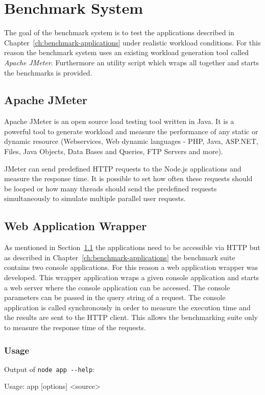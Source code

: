 \chapter{Benchmark System}
The goal of the benchmark system is to test the applications described in Chapter~\ref{ch:benchmark-applications} under realistic workload conditions. For this reason the benchmark system uses an existing workload generation tool called \textit{Apache JMeter}\cite{jmeter}. Furthermore an utility script which wraps all together and starts the benchmarks is provided.
\section{Apache JMeter}
\label{sec:apache-jmeter}
Apache JMeter is an open source load testing tool written in Java. It is a powerful tool to generate workload and measure the performance of any static or dynamic resource (Webservices, Web dynamic languages - PHP, Java, ASP.NET, Files, Java Objects, Data Bases and Queries, FTP Servers and more)\cite{jmeter}.

JMeter can send predefined HTTP requests to the Node.js applications and measure the response time. It is possible to set how often these requests should be looped or how many threads should send the predefined requests simultaneously to simulate multiple parallel user requests.
\section{Web Application Wrapper}
As mentioned in Section~\ref{sec:apache-jmeter} the applications need to be accessible via HTTP but as described in Chapter~\ref{ch:benchmark-applications} the benchmark suite contains two console applications. For this reason a web application wrapper was developed. This wrapper application wraps a given console application and starts a web server where the console application can be accessed. The console parameters can be passed in the query string of a request. The console application is called synchronously in order to measure the execution time and the results are sent to the HTTP client. This allows the benchmarking suite only to measure the response time of the requests. 

\subsection{Usage}
	Output of \texttt{node app -{}-help}:
	\par
	\begingroup
	\leftskip=1cm
	\noindent
	Usage: app [options] <source>
	
